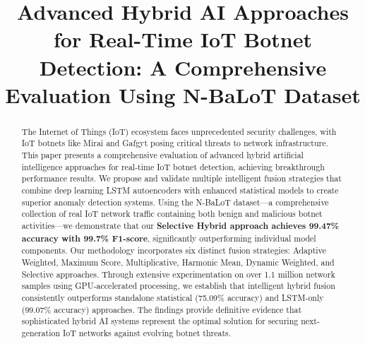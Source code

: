 \documentclass[conference]{IEEEtran}
\begin{document}
\title{Advanced Hybrid AI Approaches for Real-Time IoT Botnet Detection: A Comprehensive Evaluation Using N-BaLoT Dataset}

\author{
\and
{}
}

\maketitle

\begin{abstract}
The Internet of Things (IoT) ecosystem faces unprecedented security challenges, with IoT botnets like Mirai and Gafgyt posing critical threats to network infrastructure. This paper presents a comprehensive evaluation of advanced hybrid artificial intelligence approaches for real-time IoT botnet detection, achieving breakthrough performance results. We propose and validate multiple intelligent fusion strategies that combine deep learning LSTM autoencoders with enhanced statistical models to create superior anomaly detection systems. Using the N-BaLoT dataset—a comprehensive collection of real IoT network traffic containing both benign and malicious botnet activities—we demonstrate that our \textbf{Selective Hybrid approach achieves 99.47\% accuracy with 99.7\% F1-score}, significantly outperforming individual model components. Our methodology incorporates six distinct fusion strategies: Adaptive Weighted, Maximum Score, Multiplicative, Harmonic Mean, Dynamic Weighted, and Selective approaches. Through extensive experimentation on over 1.1 million network samples using GPU-accelerated processing, we establish that intelligent hybrid fusion consistently outperforms standalone statistical (75.09\% accuracy) and LSTM-only (99.07\% accuracy) approaches. The findings provide definitive evidence that sophisticated hybrid AI systems represent the optimal solution for securing next-generation IoT networks against evolving botnet threats.
\end{abstract}
\end{document}
